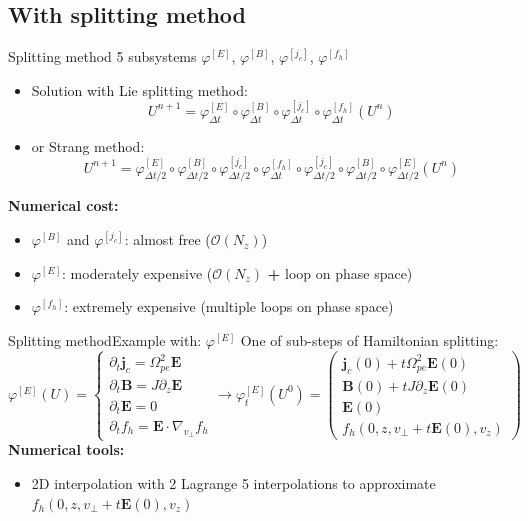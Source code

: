 \documentclass{beamer}
\newcommand{\mbold}[1]{{\textbf{\color{PLB}#1}}}
\newcommand{\Mvb}[1]{\boldsymbol{#1}}
\begin{document}
\subsection{With splitting method}
\begin{frame}{Splitting method}
  5 subsystems $\varphi^{[E]}$, $\varphi^{[B]}$, $\varphi^{[j_c]}$, $\varphi^{[f_h]}$


  \begin{itemize}
    \item Solution with Lie splitting method:
      $$
        U^{n+1} = \varphi_{\Delta t}^{[E]}
            \circ \varphi_{\Delta t}^{[B]}
            \circ \varphi_{\Delta t}^{[j_c]}
            \circ \varphi_{\Delta t}^{[f_h]} (U^n)
      $$
    \item or Strang method:
      $$
        U^{n+1} = \varphi_{\Delta t/2}^{[E]}
            \circ \varphi_{\Delta t/2}^{[B]}
            \circ \varphi_{\Delta t/2}^{[j_c]}
            \circ \varphi_{\Delta t}^{[f_h]}
            \circ \varphi_{\Delta t/2}^{[j_c]}
            \circ \varphi_{\Delta t/2}^{[B]}
            \circ \varphi_{\Delta t/2}^{[E]} (U^n)
      $$
  \end{itemize}

  \mbold{Numerical cost:}
  \begin{itemize}
    \item $\varphi^{[B]}$ and $\varphi^{[j_c]}$: almost free ($\mathcal{O}(N_z)$)
    \item $\varphi^{[E]}$: moderately expensive ($\mathcal{O}(N_z)$ \mbold{+} loop on phase space)
    \item $\varphi^{[f_h]}$: extremely expensive (multiple loops on phase space)
  \end{itemize}
\end{frame}
\begin{frame}{Splitting method}{Example with: $\varphi^{[E]}$}
  One of sub-steps of Hamiltonian splitting:
  $$
    \varphi^{[E]}(U) =
    \begin{cases}
      \partial_t \Mvb{j}_c = \Omega_{pe}^2\Mvb{E} \\
      \partial_t \Mvb{B} = J\partial_z\Mvb{E} \\
      \partial_t \Mvb{E} = 0 \\
      \partial_t f_h = \Mvb{E}\cdot\nabla_{v_\perp}f_h
    \end{cases}
    \rightarrow
    \varphi_{t}^{[E]}(U^0) = \begin{pmatrix}
      \Mvb{j}_c(0) + t\Omega_{pe}^2\Mvb{E}(0) \\
      \Mvb{B}(0) + tJ\partial_z\Mvb{E}(0) \\
      \Mvb{E}(0) \\
      f_h(0,z,v_\perp\!+t\Mvb{E}(0),v_z)
    \end{pmatrix}
  $$
  \mbold{Numerical tools:}
  \begin{itemize}
    \item 2D interpolation with 2 Lagrange 5 interpolations to approximate $f_h(0,z,v_\perp+t\Mvb{E}(0),v_z)$
  \end{itemize}
\end{frame}
\end{document}
